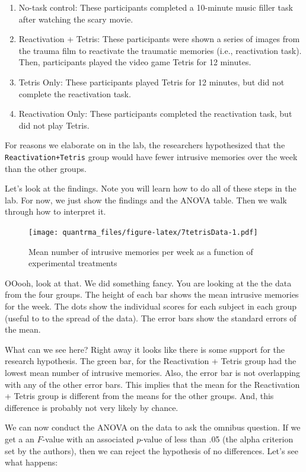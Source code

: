 \documentclass[
]{book}
\providecommand{\tightlist}{%
  \setlength{\itemsep}{0pt}\setlength{\parskip}{0pt}}
\begin{document}
\begin{enumerate}
\def\labelenumi{\arabic{enumi}.}
\tightlist
\item
  No-task control: These participants completed a 10-minute music filler task after watching the scary movie.
\item
  Reactivation + Tetris: These participants were shown a series of images from the trauma film to reactivate the traumatic memories (i.e., reactivation task). Then, participants played the video game Tetris for 12 minutes.
\item
  Tetris Only: These participants played Tetris for 12 minutes, but did not complete the reactivation task.
\item
  Reactivation Only: These participants completed the reactivation task, but did not play Tetris.
\end{enumerate}

For reasons we elaborate on in the lab, the researchers hypothesized that the \texttt{Reactivation+Tetris} group would have fewer intrusive memories over the week than the other groups.

Let's look at the findings. Note you will learn how to do all of these steps in the lab. For now, we just show the findings and the ANOVA table. Then we walk through how to interpret it.

\begin{figure}
\centering
\texttt{[image: quantrma\_files/figure-latex/7tetrisData-1.pdf]}
\caption{\label{fig:7tetrisData}Mean number of intrusive memories per week as a function of experimental treatments}
\end{figure}

OOooh, look at that. We did something fancy. You are looking at the the data from the four groups. The height of each bar shows the mean intrusive memories for the week. The dots show the individual scores for each subject in each group (useful to to the spread of the data). The error bars show the standard errors of the mean.

What can we see here? Right away it looks like there is some support for the research hypothesis. The green bar, for the Reactivation + Tetris group had the lowest mean number of intrusive memories. Also, the error bar is not overlapping with any of the other error bars. This implies that the mean for the Reactivation + Tetris group is different from the means for the other groups. And, this difference is probably not very likely by chance.

We can now conduct the ANOVA on the data to ask the omnibus question. If we get a an \(F\)-value with an associated \(p\)-value of less than .05 (the alpha criterion set by the authors), then we can reject the hypothesis of no differences. Let's see what happens:
\end{document}

